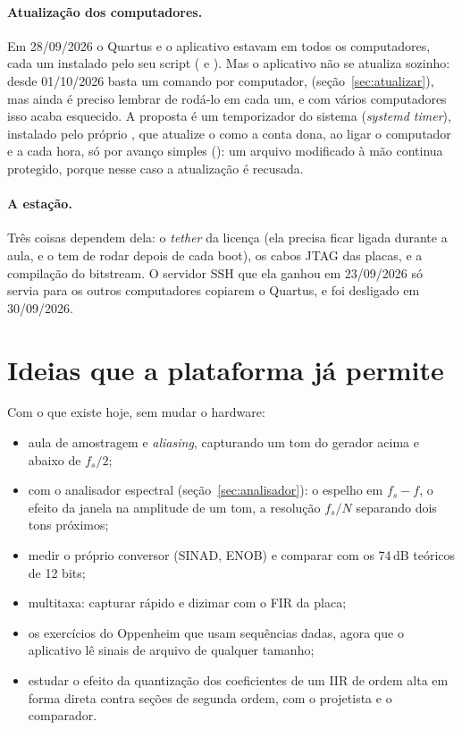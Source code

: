 \paragraph{Atualização dos computadores.} Em 28/09/2026 o Quartus e o
aplicativo estavam em todos os computadores, cada um instalado pelo seu script
( e ). Mas o aplicativo não se
atualiza sozinho: desde 01/10/2026 basta um comando por computador,
 (seção~\ref{sec:atualizar}), mas ainda é preciso
lembrar de rodá-lo em cada um, e com vários computadores isso acaba esquecido.
A proposta é um temporizador do sistema (\emph{systemd timer}),
instalado pelo próprio , que atualize o
 como a conta dona, ao ligar o computador e a cada hora, só
por avanço simples (): um arquivo modificado à mão continua
protegido, porque nesse caso a atualização é recusada.

\paragraph{A estação.} Três coisas dependem dela: o \emph{tether} da licença
(ela precisa ficar ligada durante a aula, e o  tem de rodar
depois de cada boot), os cabos JTAG das placas, e a compilação do bitstream. O
servidor SSH que ela ganhou em 23/09/2026 só servia para os outros computadores
copiarem o Quartus, e foi desligado em 30/09/2026.

\section{Ideias que a plataforma já permite}

Com o que existe hoje, sem mudar o hardware:

\begin{itemize}
  \item aula de amostragem e \emph{aliasing}, capturando um tom do gerador
    acima e abaixo de \(f_s/2\);
  \item com o analisador espectral (seção~\ref{sec:analisador}): o espelho em
    \(f_s - f\), o efeito da janela na amplitude de um tom, a resolução
    \(f_s/N\) separando dois tons próximos;
  \item medir o próprio conversor (SINAD, ENOB) e comparar com os 74\,dB
    teóricos de 12 bits;
  \item multitaxa: capturar rápido e dizimar com o FIR da placa;
  \item os exercícios do Oppenheim que usam sequências dadas, agora que o
    aplicativo lê sinais de arquivo de qualquer tamanho;
  \item estudar o efeito da quantização dos coeficientes de um IIR de ordem alta
    em forma direta contra seções de segunda ordem, com o projetista e o
    comparador.
\end{itemize}
